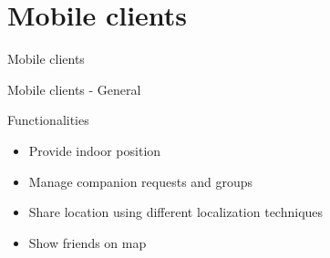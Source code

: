 \documentclass[11pt]{beamer}
\begin{document}
\section{Mobile clients}


\begin{frame}{}

  \begin{center}

    {\Huge Mobile clients}

  \end{center}

\end{frame}

\begin{frame}{Mobile clients - General}

  Functionalities\\[1em]
  \begin{itemize}
    \item Provide indoor position
    \item Manage companion requests and groups
    \item Share location using different localization techniques
    \item Show friends on map

  \end{itemize}

\end{frame}
\end{document}
